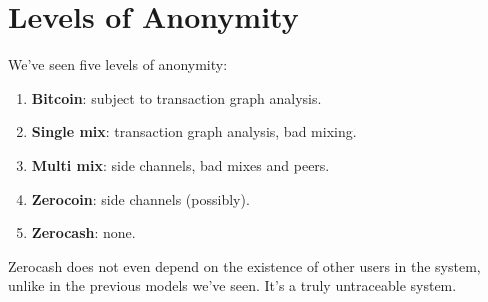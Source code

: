 \documentclass[12pt]{article}
\begin{document}
\section*{Levels of Anonymity}

We've seen five levels of anonymity:
\begin{enumerate}
\item \textbf{Bitcoin}: subject to transaction graph analysis.
\item \textbf{Single mix}: transaction graph analysis, bad mixing.
\item \textbf{Multi mix}: side channels, bad mixes and peers.
\item \textbf{Zerocoin}: side channels (possibly).
\item \textbf{Zerocash}: none.
\end{enumerate}

Zerocash does not even depend on the existence of other users in the system, unlike in the previous models we've seen. It's a truly untraceable system.
\end{document}
